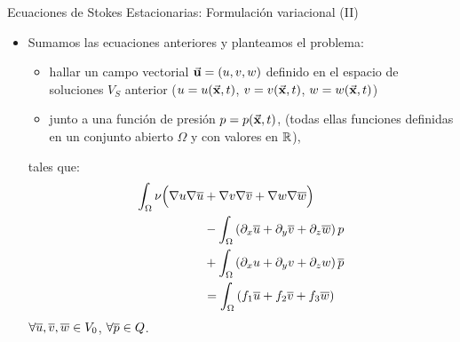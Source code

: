 \documentclass[9pt, dvipsnames,]{beamer}
\newcommand{\Vtest}{\ensuremath{V_0}}
\begin{document}
\begin{frame}{Ecuaciones de Stokes Estacionarias: Formulación variacional (II)}
  \begin{itemize}
  \item Sumamos las ecuaciones anteriores y planteamos el problema:
    \begin{itemize}
    \item hallar un campo vectorial $\vec{\mathbf{u}}=(u,v,w)$ definido
    en el espacio de soluciones $V_S$ anterior ($u=u(\vec{\mathbf{x}},t)$,
    $v=v(\vec{\mathbf{x}},t)$, $w=w(\vec{\mathbf{x}},t)$)
  \item junto a una función de presión $p=p(\vec{\mathbf{x}},t)$,
    (todas ellas funciones definidas en un conjunto abierto $\Omega$ y
    con valores en ${\mathbb R}$),
  \end{itemize}
  tales que:
    \begin{align*}
      \int_\Omega \nu\Big( \nabla u\nabla \overline u &+
      \nabla v\nabla \overline v + \nabla w\nabla \overline w \Big)
      \\
      &- \int_\Omega \left( \partial_x \overline u + \partial_y \overline v + \partial_z \overline w \right) p
      \\
      &+ \int_\Omega \left( \partial_x u + \partial_y v + \partial_z w \right) \overline {p}
      \\
      &= \int_\Omega \left( f_1 \overline u + f_2 \overline v + f_3 \overline w \right)
    \end{align*}
    $\forall \bu,\bv, \bw\in \Vtest$, $\forall\overline {p}\in Q$.
  \end{itemize}

\end{frame}
\end{document}
